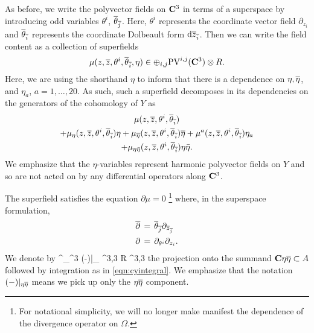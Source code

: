 \documentclass[../main.tex]{subfiles}
\begin{document}
As before, we write the polyvector fields on $\mathbf{C}^3$ in terms of a superspace by introducing odd variables $\theta^i$, $\overline{\theta}_{\overline{j}}$.  
Here, $\theta^i$ represents the coordinate vector field $\partial_{z_i}$ and $\overline \theta_{\overline{i}}$ represents the coordinate Dolbeault form $\mathrm{d} {\overline{z}}_{\overline{i}}$. 
Then we can write the field content as a collection of superfields
\begin{equation} 
		\mu(z,{\overline{z}},\theta^i, \overline{\theta}_{\overline{i}},\eta) \in \oplus_{i,j}  {\rm PV}^{i,j}(\mathbf{C}^3) \otimes R .
\end{equation}
Here, we are using the shorthand $\eta$ to inform that there is a dependence on $\eta, \overline{\eta}$, and $\eta_a$, $a=1,\ldots, 20$. 
As such, such a superfield decomposes in its dependencies on the generators of the cohomology of $Y$ as
\begin{multline}
\mu(z,{\overline{z}},\theta^i, \overline{\theta}_{\overline{i}}) \\
+ \mu_\eta (z,{\overline{z}},\theta^i, \overline{\theta}_{\overline{i}}) \eta + \mu_{\overline{\eta}} (z,{\overline{z}},\theta^i, \overline{\theta}_{\overline{i}}) \overline{\eta} + \mu^a (z,{\overline{z}},\theta^i, \overline{\theta}_{\overline{i}}) \eta_a \\
+ \mu_{\eta \Bar{\eta}} (z,{\overline{z}},\theta^i, \overline{\theta}_{\overline{i}}) \eta \Bar{\eta} .
\end{multline}
We emphasize that the $\eta$-variables represent harmonic polyvector fields on $Y$ and so are not acted on by any differential operators along $\mathbf{C}^3$. 

The superfield satisfies the equation $\partial \mu = 0$ \footnote{For notational simplicity, we will no longer make manifest the dependence of the divergence operator on $\Omega$.}
where, in the superspace formulation,
\begin{align} 
	\overline{\partial} & \, = \, \overline{\theta}_{\overline{j}} \partial_{{\overline{z}}_{\overline{j}}} \\
	\partial &\, = \, \partial_{\theta^i} \partial_{z_i}.  
\end{align}
We denote by
\beqn
\int^\Omega_{\C^3} (-)|_{\eta \br \eta} \colon \PV^{3,3} \otimes R \to \eta \br \eta \PV^{3,3}  \to \C
\eeqn
the projection onto the summand $\mathbf{C} \eta \overline \eta \subset A$ followed by integration as in \eqref{eqn:cyintegral}.
We emphasize that the notation $(-)|_{\eta \overline{\eta}}$ means we pick up only the $\eta \overline{\eta}$ component.
\end{document}
